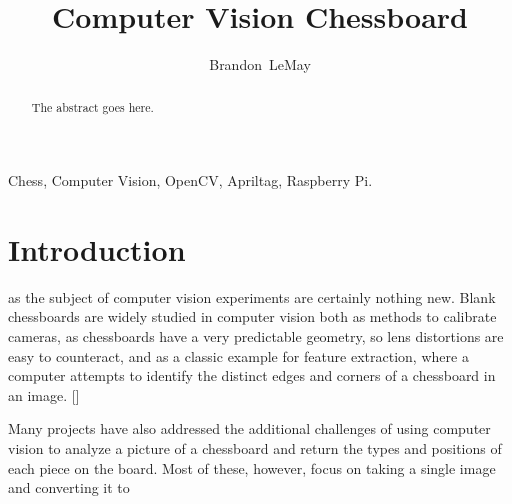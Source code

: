 \documentclass[journal]{IEEEtran}
\begin{document}
\title{Computer Vision Chessboard}

\author{Brandon~LeMay}

\maketitle

\begin{abstract}
The abstract goes here.
\end{abstract}

\begin{IEEEkeywords}
Chess, Computer Vision, OpenCV, Apriltag, Raspberry Pi.
\end{IEEEkeywords}


\section{Introduction}
 as the subject of computer vision experiments are certainly nothing new. Blank chessboards are widely studied in computer vision both as methods to calibrate cameras, as chessboards have a very predictable geometry, so lens distortions are easy to counteract, and as a classic example for feature extraction, where a computer attempts to identify the distinct edges and corners of a chessboard in an image. [\cite{Forsyth2002}]

Many projects have also addressed the additional challenges of using computer vision to analyze a picture of a chessboard and return the types and positions of each piece on the board. Most of these, however, focus on taking a single image and converting it to 

%
%
\end{document}
